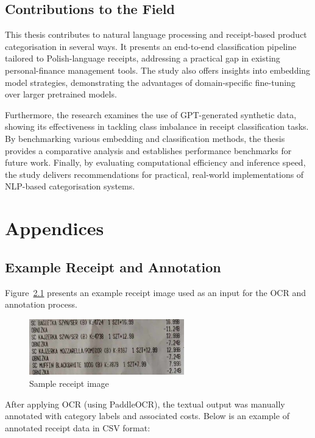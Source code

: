 \documentclass{SGGW-thesis-EN}
\begin{document}
\section{Contributions to the Field}
This thesis contributes to natural language processing and receipt-based product categorisation in several ways.
It presents an end-to-end classification pipeline tailored to Polish-language receipts, addressing a practical gap
in existing personal-finance management tools. The study also offers insights into embedding model strategies,
demonstrating the advantages of domain-specific fine-tuning over larger pretrained models.

Furthermore, the research examines the use of GPT-generated synthetic data, showing its effectiveness in tackling
class imbalance in receipt classification tasks. By benchmarking various embedding and classification methods, the
thesis provides a comparative analysis and establishes performance benchmarks for future work. Finally, by
evaluating computational efficiency and inference speed, the study delivers recommendations for practical,
real-world implementations of NLP-based categorisation systems.


\chapter{Appendices}

\section{Example Receipt and Annotation}

Figure~\ref{fig:sample_receipt} presents an example receipt image used as an input for the OCR and annotation process.

\begin{figure}[h]
    \centering
    \includegraphics[width=0.6\textwidth]{images/sample_receipt.jpg}
    \caption{Sample receipt image}
    \label{fig:sample_receipt}
\end{figure}

After applying OCR (using PaddleOCR), the textual output was manually annotated with category labels and associated costs.
Below is an example of annotated receipt data in CSV format:
\end{document}
